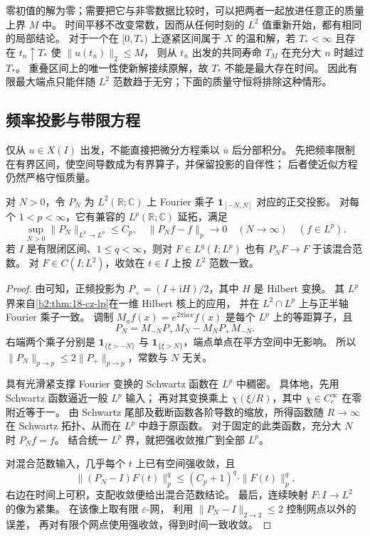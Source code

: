 零初值的解为零；需要把它与非零数据比较时，可以把两者一起放进任意正的质量上界 \(M\) 中。
时间平移不改变常数，因而从任何时刻的 \(L^2\) 值重新开始，都有相同的局部结论。
对于一个在 \([0,T_*)\) 上逐紧区间属于 \(X\) 的温和解，若 \(T_*<\infty\)
且存在 \(t_n\uparrow T_*\) 使 \(\|u(t_n)\|_2\le M\)，
则从 \(t_n\) 出发的共同寿命 \(T_M\) 在充分大 \(n\) 时越过 \(T_*\)。
重叠区间上的唯一性使新解接续原解，故 \(T_*\) 不能是最大存在时间。
因此有限最大端点只能伴随 \(L^2\) 范数趋于无穷；下面的质量守恒将排除这种情形。

\subsection{频率投影与带限方程}
\label{b2:subsec:E-cubic-truncation}

仅从 \(u\in X(I)\) 出发，不能直接把微分方程乘以 \(\overline u\) 后分部积分。
先把频率限制在有界区间，使空间导数成为有界算子，并保留投影的自伴性；
后者使近似方程仍然严格守恒质量。

\begin{lemma}[一维区间频率投影]\label{b2:lem:E-frequency-projection}
对 \(N>0\)，令 \(P_N\) 为 \(L^2(\mathbb R;\mathbb C)\) 上 Fourier 乘子
\(\mathbf1_{[-N,N]}\) 对应的正交投影。
对每个 \(1<p<\infty\)，它有兼容的 \(L^p(\mathbb R;\mathbb C)\) 延拓，满足
\[
 \sup_{N>0}\|P_N\|_{L^p\to L^p}\le C_p,
 \quad \|P_Nf-f\|_p\longrightarrow0\quad(N\to\infty)
 \quad(f\in L^p).
\]
若 \(I\) 是有限闭区间、\(1\le q<\infty\)，则对
\(F\in L^q(I;L^p)\) 也有 \(P_NF\to F\) 于该混合范数。
对 \(F\in C(I;L^2)\)，收敛在 \(t\in I\) 上按 \(L^2\) 范数一致。
\end{lemma}
\begin{proof}
由可知，正频投影为
\(P_+=(I+\mathrm iH)/2\)，其中 \(H\) 是 Hilbert 变换。
其 \(L^p\) 界来自\cref{b2:thm:18-cz-lp}在一维 Hilbert 核上的应用，
并在 \(L^2\cap L^p\) 上与正半轴 Fourier 乘子一致。
调制 \(M_af(x)=e^{2\pi\mathrm iax}f(x)\) 是每个 \(L^p\) 上的等距算子，且
\[
 P_N=M_{-N}P_+M_N-M_NP_+M_{-N}.
\]
右端两个乘子分别是 \(\mathbf1_{\{\xi>-N\}}\) 与
\(\mathbf1_{\{\xi>N\}}\)，端点单点在平方空间中无影响。
所以 \(\|P_N\|_{p\to p}\le2\|P_+\|_{p\to p}\)，常数与 \(N\) 无关。

具有光滑紧支撑 Fourier 变换的 Schwartz 函数在 \(L^p\) 中稠密。
具体地，先用 Schwartz 函数逼近一般 \(L^p\) 输入；
再对其变换乘上 \(\chi(\xi/R)\)，其中 \(\chi\in C_c^\infty\) 在零附近等于一。
由 Schwartz 尾部及截断函数各阶导数的缩放，所得函数随 \(R\to\infty\)
在 Schwartz 拓扑、从而在 \(L^p\) 中趋于原函数。
对于固定的此类函数，充分大 \(N\) 时 \(P_Nf=f\)。
结合统一 \(L^p\) 界，就把强收敛推广到全部 \(L^p\)。

对混合范数输入，几乎每个 \(t\) 上已有空间强收敛，且
\[
 \|(P_N-I)F(t)\|_p^q
 \le(C_p+1)^q\cdot\|F(t)\|_p^q.
\]
右边在时间上可积，支配收敛便给出混合范数结论。
最后，连续映射 \(F:I\to L^2\) 的像为紧集。
在该像上取有限 \(\varepsilon\)-网，
利用 \(\|P_N-I\|_{2\to2}\le2\) 控制网点以外的误差，
再对有限个网点使用强收敛，得到时间一致收敛。
\end{proof}

